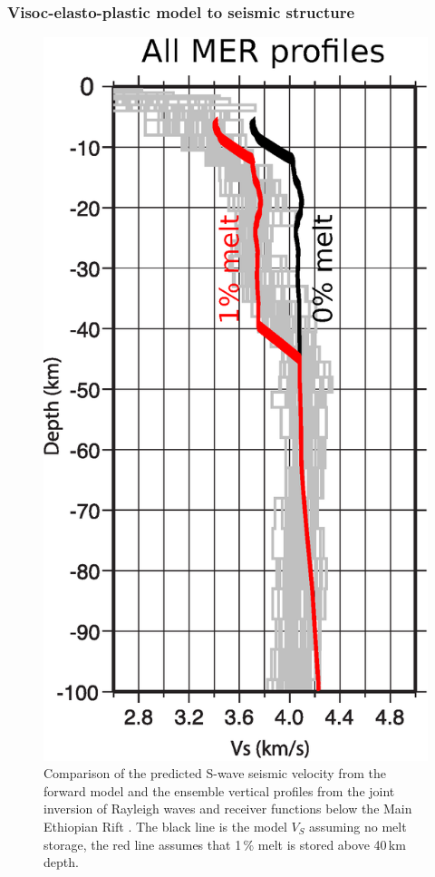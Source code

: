 \documentclass[aspectratio=169]{beamer}
\begin{document}
\begin{frame}
    \frametitle{Visoc-elasto-plastic model to seismic structure}
    \begin{figure}
        \includegraphics[height=0.5\paperheight]{./figures/MER2.png}
        \caption{Comparison of the predicted S-wave seismic velocity from the forward model and the ensemble vertical
                 profiles from the joint inversion of Rayleigh waves and receiver functions below the Main Ethiopian Rift
                 \citep{keranen-etal-2009}. The black line is the model $V_{S}$ assuming no melt storage, the red line
                 assumes that 1\,\% melt is stored above 40\,km depth.}
    \end{figure}
\end{frame}
\end{document}
